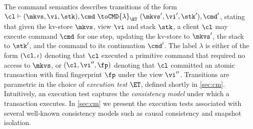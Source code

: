 The command semantics describes transitions of the form
$\cl \vdash (\mkvs, \vi, \stk), \cmd \ \toCMD{\lambda}_{\ET} \ (\mkvs', \vi', \stk') ,
\cmd'$, stating that given the kv-store $\mkvs$, view $\vi$ and stack $\stk$, 
a client $\cl$ may execute command $\cmd$ for one step, updating 
the kv-store to $\mkvs'$, the stack to $\stk'$, and the command to its continuation $\cmd'$.
The label $\lambda$ is either of the form $(\cl, \iota)$ denoting that $\cl$ executed a primitive command
that required no access to $\mkvs$, 
or $(\cl, \vi'', \fp)$ denoting that $\cl$ committed an atomic transaction with final fingerprint $\fp$ under the view $\vi''$.
Transitions are parametric in the choice of \emph{execution test} $\ET$, defined shortly in \cref{sec:cm}.
Intuitively, an execution test captures the \emph{consistency model} under which a transaction executes.
In \cref{sec:cm} we present the execution tests associated with several well-known consistency models
such as causal consistency and snapshot isolation.


